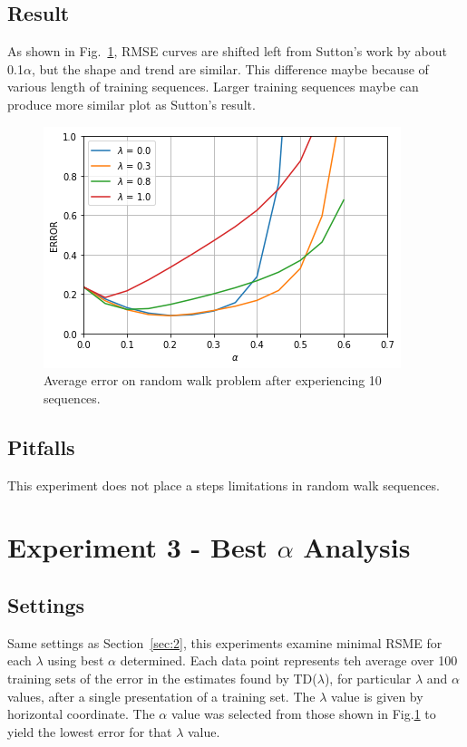 \documentclass[conference]{IEEEtran}
\begin{document}
\subsection{Result}

As shown in Fig.~\ref{fig3}, RMSE curves are shifted left from Sutton's work by about 0.1$\alpha$, but the shape and trend are similar. This difference maybe because of various length of training sequences. Larger training sequences maybe can produce more similar plot as Sutton's result.

\begin{figure}[htbp]
\includegraphics[width=\linewidth]{output2.png}
\caption{Average error on random walk problem after experiencing 10 sequences.}
\label{fig3}
\end{figure}

\subsection{Pitfalls}

This experiment does not place a steps limitations in random walk sequences. 

\section{Experiment 3 - Best $\alpha$ Analysis}\label{sec:3}

\subsection{Settings}
Same settings as Section~\ref{sec:2}, this experiments examine minimal RSME for each $\lambda$ using best $\alpha$ determined. Each data point represents teh average over 100 training sets of the error in the estimates found by TD($\lambda$), for particular $\lambda$  and $\alpha$ values, after a single presentation of a training set. The $\lambda$ value is given by horizontal coordinate. The $\alpha$ value was selected from those shown in Fig.\ref{fig3} to yield the lowest error for that $\lambda$ value.
\end{document}
